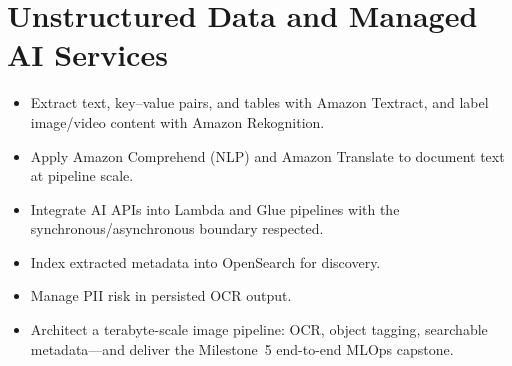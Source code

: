 \chapter{Unstructured Data and Managed AI Services}
%
\begin{objectives}
\begin{itemize}
    \item Extract text, key--value pairs, and tables with Amazon Textract, and label image/video content with Amazon Rekognition.
    \item Apply Amazon Comprehend (NLP) and Amazon Translate to document text at pipeline scale.
    \item Integrate AI APIs into Lambda and Glue pipelines with the synchronous/asynchronous boundary respected.
    \item Index extracted metadata into OpenSearch for discovery.
    \item Manage PII risk in persisted OCR output.
    \item Architect a terabyte-scale image pipeline: OCR, object tagging, searchable metadata---and deliver the Milestone~5 end-to-end MLOps capstone.
\end{itemize}
\end{objectives}

